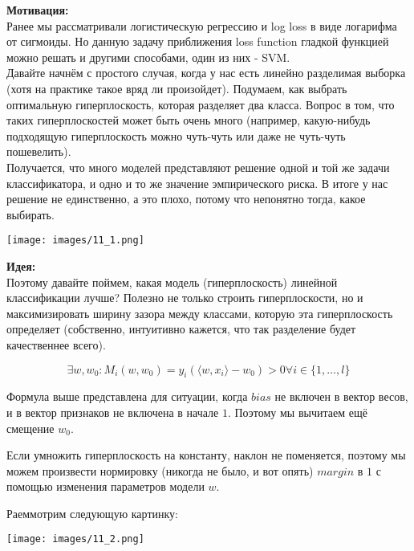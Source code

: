 \textbf{Мотивация:}\\

Ранее мы рассматривали логистическую регрессию и log loss в виде логарифма от сигмоиды. Но данную задачу приближения loss function гладкой функцией можно решать и другими способами, один из них - SVM.\\

Давайте начнём с простого случая, когда у нас есть линейно разделимая выборка (хотя на практике такое вряд ли произойдет). Подумаем, как выбрать оптимальную гиперплоскость, которая разделяет два класса. Вопрос в том, что таких гиперплоскостей может быть очень много (например, какую-нибудь подходящую гиперплоскость можно чуть-чуть или даже не чуть-чуть пошевелить). \\

Получается, что много моделей представляют решение одной и той же задачи классификатора, и одно и то же значение эмпирического риска. В итоге у нас решение не единственно, а это плохо, потому что непонятно тогда, какое выбирать. \\

\begin{center}
    \texttt{[image: images/11\_1.png]}
\end{center}

\textbf{Идея:}\\

Поэтому давайте поймем, какая модель (гиперплоскость) линейной классификации лучше? Полезно не только строить гиперплоскости, но и максимизировать ширину зазора между классами, которую эта гиперплоскость определяет (собственно, интуитивно кажется, что так разделение будет качественнее всего).

$$\exists w, w_0 : M_i(w, w_0) = y_i(\langle w, x_i \rangle - w_0) > 0 \forall i \in \{1, \dots, l\}$$

Формула выше представлена для ситуации, когда $bias$ не включен в вектор весов, и в вектор признаков не включена в начале $1$. Поэтому мы вычитаем ещё смещение $w_0$.

Если умножить гиперплоскость на константу, наклон не поменяется, поэтому мы можем произвести нормировку (никогда не было, и вот опять) $margin$ в $1$ с помощью изменения параметров модели $w$.

Раеммотрим следующую картинку: 

\begin{center}
    \texttt{[image: images/11\_2.png]}
\end{center}

